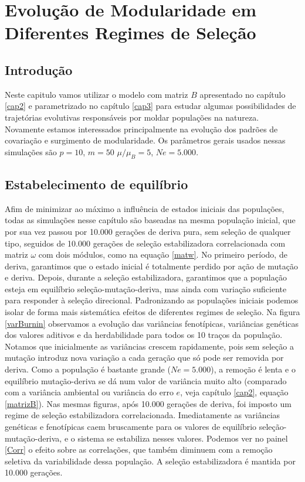 \pagestyle{empty}
\cleardoublepage
\pagestyle{fancy}
\chapter{Evolução de Modularidade em Diferentes Regimes de
Seleção}\label{cap4}

\section{Introdução}

Neste capitulo vamos utilizar o modelo com matriz $B$ apresentado no
capítulo \ref{cap2} e parametrizado no capítulo \ref{cap3} para estudar
algumas possibilidades de trajetórias evolutivas responsáveis por moldar
populações na natureza. 
Novamente estamos interessados principalmente na evolução dos padrões de
covariação e surgimento de modularidade. 
Os parâmetros gerais usados nessas simulações são $p = 10$, $m = 50$
$\mu/\mu_B = 5$, $Ne = 5.000$. 

\section{Estabelecimento de equilíbrio}

Afim de minimizar ao máximo a influência de estados iniciais das
populações, todas as simulações nesse capítulo são baseadas na mesma
população inicial, que por sua vez passou por 10.000 gerações de deriva
pura, sem seleção de qualquer tipo, seguidos de 10.000 gerações de
seleção estabilizadora correlacionada com matriz $\omega$ com dois
módulos, como na equação \ref{matw}. 
No primeiro período, de deriva, garantimos que o estado inicial é
totalmente perdido por ação de mutação e deriva. 
Depois, durante a seleção estabilizadora, garantimos que a população
esteja em equilíbrio seleção-mutação-deriva, mas ainda com variação
suficiente para responder à seleção direcional. 
Padronizando as populações iniciais podemos isolar de forma mais
sistemática efeitos de diferentes regimes de seleção. 
Na figura \ref{varBurnin} observamos a evolução das variâncias
fenotípicas, variâncias genéticas dos valores aditivos e da
herdabilidade para todos os 10 traços da população. 
Notamos que inicialmente as variâncias crescem rapidamente, pois sem
seleção a mutação introduz nova variação a cada geração que só pode ser
removida por deriva. 
Como a população é bastante grande ($Ne = 5.000$), a remoção é lenta e o
equilíbrio mutação-deriva se dá num valor de variância muito alto
(comparado com a variância ambiental ou variância do erro $e$, veja
capítulo \ref{cap2}, equação \ref{matrizB}). 
Nas mesmas figuras, após 10.000 gerações de deriva, foi imposto um regime de
seleção estabilizadora correlacionada. 
Imediatamente as variâncias genéticas e fenotípicas caem bruscamente
para os valores de equilíbrio seleção-mutação-deriva, e o sistema se
estabiliza nesses valores. 
Podemos ver no painel \ref{Corr} o efeito sobre as correlações,
que também diminuem com a remoção seletiva da variabilidade dessa
população. 
A seleção estabilizadora é mantida por 10.000 gerações. 


